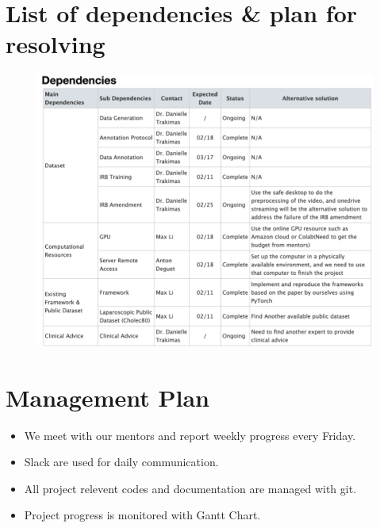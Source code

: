 \documentclass[11pt]{article} \usepackage[top=1in, bottom=1in, left=1in, right=1in]{geometry}
\begin{document}
\section{List of dependencies \& plan for resolving}
\begin{figure}[H]
    \includegraphics[width=\textwidth]{dependency.png}
    \label{fig:dependency}
\end{figure}


\section{Management Plan}
\begin{itemize}
    \item We meet with our mentors and report weekly progress every Friday.
    \item Slack are used for daily communication.
    \item All project relevent codes and documentation are managed with git.
    \item Project progress is monitored with Gantt Chart. 
\end{itemize}
\newpage
\nocite{*}


\end{document}
